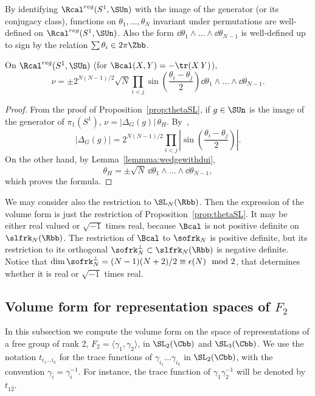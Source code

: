 By identifying $\Rcal^{reg}(S^1, \SUn)$ with the image of the generator (or its conjugacy class), functions on $\theta_1,\dots,\theta_N$ invariant under permutations are well-defined on $\Rcal^{reg}(S^1, \SUn)$. Also the form $\dd\theta_1\wedge\dots\wedge \dd \theta_{N-1}$ is well-defined up to sign by the relation $\sum\theta_i\in 2\pi\Zbb$.

\begin{prop}\label{prop:SUn}
On $\Rcal^{reg}(S^1, \SUn)$ (for $\Bcal(X,Y)=-\tr(X\, Y)$),
\[
\nu= \pm 2^{N(N-1)/2} \sqrt{N} \prod_{i<j} \sin\left(\frac{\theta_i-\theta_j}{2}\right) \dd\theta_1\wedge\dots\wedge \dd \theta_{N-1}.
\]
\end{prop}

\begin{proof}
From the proof of Proposition~\ref{prop:thetaSL}, if $g\in \SUn $ is the image of the generator of $\pi_1(S^1)$, $\nu= \vert \Delta_{G}({g})\vert \,\theta_{H} $. By~\cite[Exercise~7.3.5]{GoodWall},
\[
\vert \Delta_{G}({g}) \vert = 2^{N(N-1)/2} \prod_{i<j} \left\vert \sin\left(\frac{\theta_i-\theta_j}{2}\right) \right\vert.
\]
On the other hand, by Lemma~\ref{lemmma:wedgewithdui},
\[
\theta_{H}= \pm\sqrt{N} \, \dd\theta_1\wedge\dots\wedge \dd \theta_{N-1},
\]
which proves the formula.
\end{proof}

\begin{rema}\label{rem:SLnR}
We may consider also the restriction to $\SL_N(\Rbb)$. Then the expression of the volume form is just the restriction of Proposition~\ref{prop:thetaSL}. It may be either real valued or $\sqrt{-1}$ times real, because $\Bcal$ is not positive definite on $\slfrk_N(\Rbb)$. The restriction of $\Bcal$ to $\sofrk_N$ is positive definite, but its restriction to its orthogonal $\sofrk_N^\perp\subset \slfrk_N(\Rbb)$ is negative definite. Notice that $\dim \sofrk_N^\perp =(N-1)(N+2)/2\equiv \epsilon (N) \mod 2$, that determines whether it is real or $\sqrt{-1}$ times real.
\end{rema}



\subsection{Volume form for representation spaces of \texorpdfstring{$F_2$}{F2}}

In this subsection we compute the volume form on the space of representations of a free group of rank 2, $F_2=\langle \gamma_1,\gamma_2\rangle$, in $\SL_2(\Cbb)$ and $\SL_3(\Cbb)$. We use the notation $t_{i_1\dots i_k}$ for the trace functions of $\gamma_{i_1}\dots \gamma_{i_k}$ in $\SL_2(\Cbb)$, with the convention $\gamma_{\bar i}=\gamma_i ^{-1}$. For instance, the trace function of $\gamma_1\gamma_2^{-1}$ will be denoted by $t_{1\bar 2}$.

